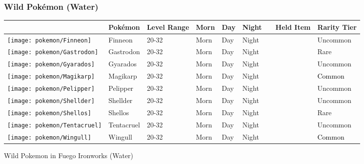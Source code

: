 \subsubsection{Wild Pokémon (Water)}%
\label{ssubsec:WildPokmon(Water)}%
\begin{longtable}{||l l l l l l l l l||}%
\hline%
\rowcolor{WaterColor}%
&Pokémon&Level Range&Morn&Day&Night&&Held Item&Rarity Tier\\%
\hline%
\endhead%
\hline%
\rowcolor{WaterColor}%
\texttt{[image: pokemon/Finneon]}&Finneon&20{-}32&Morn&Day&Night&&&\textcolor{OliveGreen}{%
Uncommon%
}\\%
\hline%
\rowcolor{WaterColor}%
\texttt{[image: pokemon/Gastrodon]}&Gastrodon&20{-}32&Morn&Day&Night&&&\textcolor{RedOrange}{%
Rare%
}\\%
\hline%
\rowcolor{WaterColor}%
\texttt{[image: pokemon/Gyarados]}&Gyarados&20{-}32&Morn&Day&Night&&&\textcolor{OliveGreen}{%
Uncommon%
}\\%
\hline%
\rowcolor{WaterColor}%
\texttt{[image: pokemon/Magikarp]}&Magikarp&20{-}32&Morn&Day&Night&&&\textcolor{black}{%
Common%
}\\%
\hline%
\rowcolor{WaterColor}%
\texttt{[image: pokemon/Pelipper]}&Pelipper&20{-}32&Morn&Day&Night&&&\textcolor{OliveGreen}{%
Uncommon%
}\\%
\hline%
\rowcolor{WaterColor}%
\texttt{[image: pokemon/Shellder]}&Shellder&20{-}32&Morn&Day&Night&&&\textcolor{OliveGreen}{%
Uncommon%
}\\%
\hline%
\rowcolor{WaterColor}%
\texttt{[image: pokemon/Shellos]}&Shellos&20{-}32&Morn&Day&Night&&&\textcolor{RedOrange}{%
Rare%
}\\%
\hline%
\rowcolor{WaterColor}%
\texttt{[image: pokemon/Tentacruel]}&Tentacruel&20{-}32&Morn&Day&Night&&&\textcolor{OliveGreen}{%
Uncommon%
}\\%
\hline%
\rowcolor{WaterColor}%
\texttt{[image: pokemon/Wingull]}&Wingull&20{-}32&Morn&Day&Night&&&\textcolor{black}{%
Common%
}\\%
\hline%
\end{longtable}%
\caption{Wild Pokemon in Fuego Ironworks (Water)}